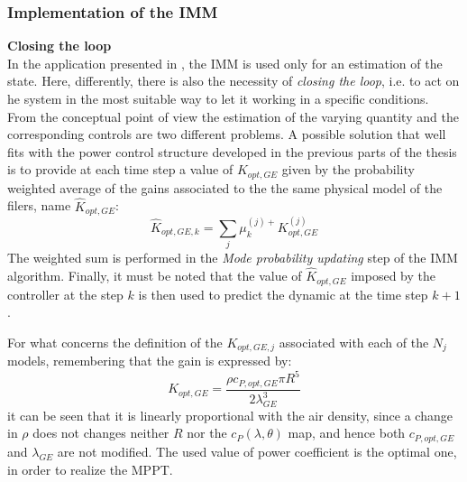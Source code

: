 \subsubsection{Implementation of the IMM}
\textbf{Closing the loop}\\
In the application presented in \cite{kalman_based_IMM}, the IMM is used only for an estimation of the state. Here, differently, there is also the necessity of \textit{closing the loop}, i.e. to act on he system in the most suitable way to let it working in a specific conditions. From the conceptual point of view the estimation of the varying quantity and the corresponding controls are two different problems. A possible solution that well fits with the power control structure developed in the previous parts of the thesis is to provide at each time step a value of $K_{opt,GE}$ given by the probability weighted average of the gains associated to the the same physical model of the filers, name $\hat{K}_{opt,GE}$:
\begin{equation}
  \hat{K}_{opt,GE,k} = \sum_j \mu_k^{(j)+} K_{opt,GE}^{(j)}
\end{equation}
The weighted sum is performed in the \textit{Mode probability updating} step of the IMM algorithm. Finally, it must be noted that the value of $\hat{K}_{opt,GE}$ imposed by the controller at the step $k$ is then used to predict the dynamic at the time step $k+1$.

For what concerns the definition of the $K_{opt, GE, j}$ associated with each of the $N_j$ models, remembering that the gain is expressed by:
\begin{equation}
  K_{opt,GE} = \frac{\rho c_{P,opt,GE}\pi R^5}{2\lambda_{GE}^3}
\end{equation}
it can be seen that it is linearly proportional with the air density, since a change in $\rho$ does not changes neither $R$ nor the $c_P(\lambda,\theta)$ map, and hence both $c_{P,opt,GE}$ and $\lambda_{GE}$ are not modified. The used value of power coefficient is the optimal one, in order to realize the MPPT. 

